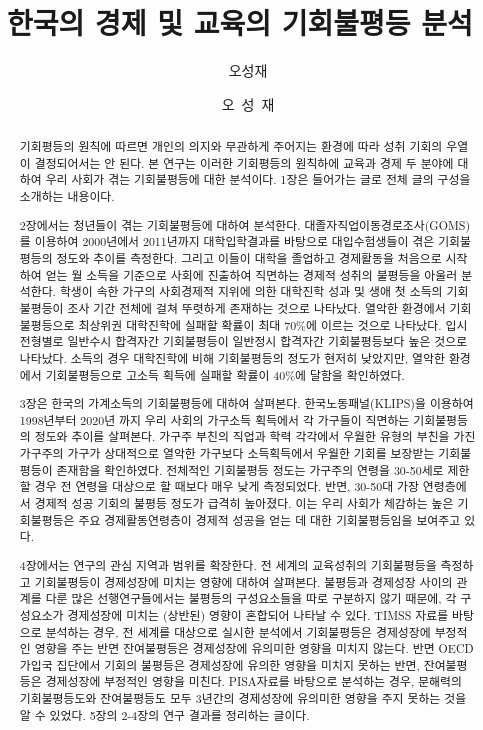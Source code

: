 \documentclass[oneside,ko,phd]{snuthesis}
\title{한국의 경제 및 교육의 기회불평등 분석}
\title*{~}
\author{오성재}
\author*{오~성~재} %
\begin{document}
\makefrontcover
\makefrontcover
\makeapproval

\cleardoublepage
{}

\begin{abstract}
기회평등의 원칙에 따르면 개인의 의지와 무관하게 주어지는 환경에 따라 성취 기회의 우열이 결정되어서는 안 된다. 본 연구는 이러한 기회평등의 원칙하에 교육과 경제 두 분야에 대하여 우리 사회가 겪는 기회불평등에 대한 분석이다. 1장은 들어가는 글로 전체 글의 구성을 소개하는 내용이다.

2장에서는 청년들이 겪는 기회불평등에 대하여 분석한다. 대졸자직업이동경로조사(GOMS)를 이용하여 2000년에서 2011년까지 대학입학결과를 바탕으로 대입수험생들이 겪은 기회불평등의 정도와 추이를 측정한다. 그리고 이들이 대학을 졸업하고 경제활동을 처음으로 시작하여 얻는 월 소득을 기준으로 사회에 진출하여 직면하는 경제적 성취의 불평등을 아울러 분석한다.  학생이 속한 가구의 사회경제적 지위에 의한 대학진학 성과 및 생애 첫 소득의 기회불평등이 조사 기간 전체에 걸쳐 뚜렷하게 존재하는 것으로 나타났다. 열악한 환경에서 기회불평등으로 최상위권 대학진학에 실패할 확률이 최대 70\%에 이르는 것으로 나타났다. 입시 전형별로 일반수시 합격자간 기회불평등이 일반정시 합격자간 기회불평등보다 높은 것으로 나타났다. 소득의 경우 대학진학에 비해 기회불평등의 정도가 현저히 낮았지만, 열악한 환경에서 기회불평등으로 고소득 획득에 실패할 확률이 40\%에 달함을 확인하였다.

3장은 한국의 가계소득의 기회불평등에 대하여 살펴본다. 한국노동패널(KLIPS)을 이용하여 1998년부터 2020년 까지 우리 사회의 가구소득 획득에서 각 가구들이 직면하는 기회불평등의 정도와 추이를 살펴본다. 가구주 부친의 직업과 학력 각각에서 우월한 유형의 부친을 가진 가구주의 가구가 상대적으로 열악한 가구보다 소득획득에서 우월한 기회를 보장받는 기회불평등이 존재함을 확인하였다. 전체적인 기회불평등 정도는 가구주의 연령을 30-50세로 제한할 경우 전 연령을 대상으로 할 때보다 매우 낮게 측정되었다. 반면, 30-50대 가장 연령층에서 경제적 성공 기회의 불평등 정도가 급격히 높아졌다. 이는 우리 사회가 체감하는 높은 기회불평등은 주요 경제활동연령층이 경제적 성공을 얻는 데 대한 기회불평등임을 보여주고 있다.

4장에서는 연구의 관심 지역과 범위를 확장한다. 전 세계의 교육성취의 기회불평등을 측정하고 기회불평등이 경제성장에 미치는 영향에 대하여 살펴본다. 불평등과 경제성장 사이의 관계를 다룬 많은 선행연구들에서는 불평등의 구성요소들을 따로 구분하지 않기 때문에, 각 구성요소가 경제성장에 미치는 (상반된) 영향이 혼합되어 나타날 수 있다. TIMSS 자료를 바탕으로 분석하는 경우, 전 세계를 대상으로 실시한 분석에서 기회불평등은 경제성장에 부정적인 영향을 주는 반면 잔여불평등은 경제성장에 유의미한 영향을 미치지 않는다. 반면 OECD 가입국 집단에서 기회의 불평등은 경제성장에 유의한 영향을 미치지 못하는 반면, 잔여불평등은 경제성장에 부정적인 영향을 미친다. PISA자료를 바탕으로 분석하는 경우, 문해력의 기회불평등도와 잔여불평등도 모두 3년간의 경제성장에 유의미한 영향을 주지 못하는 것을 알 수 있었다.  5장의 2-4장의 연구 결과를 정리하는 글이다.

\end{abstract}
\end{document}
